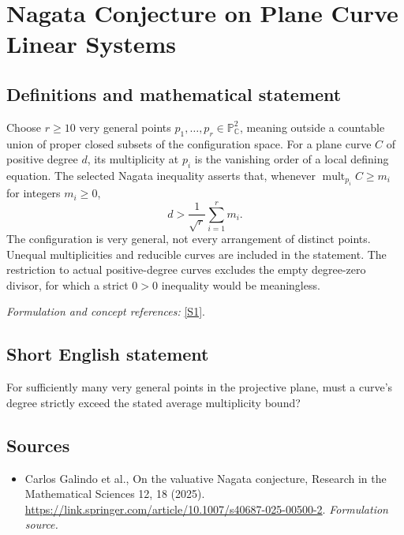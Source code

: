 \documentclass[11pt]{article}
\begin{document}
\section*{\texorpdfstring{Nagata Conjecture on Plane Curve Linear Systems}{Nagata Conjecture on Plane Curve Linear Systems}}\label{30006987}
\subsection{Definitions and mathematical statement}
Choose $r\ge10$ very general points $p_1,\ldots,p_r\in{\mathbb{P}}^2_{{\mathbb{C}}}$, meaning outside a countable union of proper closed subsets of the configuration space. For a plane curve $C$ of positive degree $d$, its multiplicity at $p_i$ is the vanishing order of a local defining equation. The selected Nagata inequality asserts that, whenever $\operatorname{mult}_{p_i}C\ge m_i$ for integers $m_i\ge0$,
\[
 d>\frac1{\sqrt r}\sum_{i=1}^r m_i.
\]
The configuration is very general, not every arrangement of distinct points. Unequal multiplicities and reducible curves are included in the statement. The restriction to actual positive-degree curves excludes the empty degree-zero divisor, for which a strict $0>0$ inequality would be meaningless.
\par\smallskip\textit{Formulation and concept references:} \href{https://link.springer.com/article/10.1007/s40687-025-00500-2}{[S1]}.

\subsection{Short English statement}
For sufficiently many very general points in the projective plane, must a curve's degree strictly exceed the stated average multiplicity bound?
\subsection{Sources}
\begin{itemize}
\item[S1]Carlos Galindo et al., On the valuative Nagata conjecture, Research in the Mathematical Sciences 12, 18 (2025).
\url{https://link.springer.com/article/10.1007/s40687-025-00500-2}.
\textit{Formulation source.}
\end{itemize}
\end{document}
